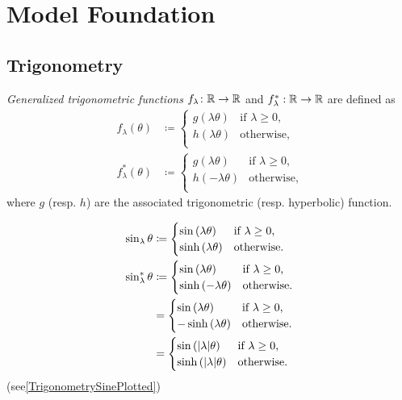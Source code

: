 \documentclass[../main.tex]{subfiles}
\begin{document}
\section{Model Foundation}
\subsection{Trigonometry}
\begin{definition}\label{M:Trigonometry}
\textit{Generalized trigonometric functions} \(f_\lambda\colon \mathbb{R}\to\mathbb{R}\) and \(f_\lambda^\ast:\mathbb{R}\to\mathbb{R}\) are defined as
\begin{align*}
f_\lambda\left(\theta\right)&\coloneqq
\begin{cases}
g\left(\lambda\theta\right)&\text{if \(\lambda\geq0\),}\\
h\left(\lambda\theta\right)&\text{otherwise,}\\
\end{cases}\\
f_\lambda^\ast\left(\theta\right)&\coloneqq
\begin{cases}
g\left(\lambda\theta\right)&\text{if \(\lambda\geq0\),}\\
h\left(-\lambda\theta\right)&\text{otherwise,}\\
\end{cases}
\end{align*}
where \(g\) (resp. \(h\)) are the associated trigonometric (resp. hyperbolic) function.
\end{definition}
\begin{example}\label{M:Trigonometry:Sine}
\begin{align*}
\sin_\lambda{\theta}
&\coloneqq
\begin{cases}
\sin\left(\lambda\theta\right)&\text{if \(\lambda\geq0\),}\\
\sinh\left(\lambda\theta\right)&\text{otherwise.}\\
\end{cases}\\
\sin_\lambda^\ast{\theta}
&\coloneqq
\begin{cases}
\sin\left(\lambda\theta\right)&\text{if \(\lambda\geq0\),}\\
\sinh\left(-\lambda\theta\right)&\text{otherwise.}\\
\end{cases}\\
&=
\begin{cases}
\sin\left(\lambda\theta\right)&\text{if \(\lambda\geq0\),}\\
-\sinh\left(\lambda\theta\right)&\text{otherwise.}\\
\end{cases}\\
&=\begin{cases}
\sin\left(\lvert\lambda\rvert\theta\right)&\text{if \(\lambda\geq0\),}\\
\sinh\left(\lvert\lambda\rvert\theta\right)&\text{otherwise.}\\
\end{cases}
\end{align*}
(see\cref{TrigonometrySinePlotted})
\end{example}
\end{document}
